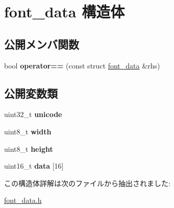 \hypertarget{structfont__data}{}\section{font\+\_\+data 構造体}
\label{structfont__data}
\subsection*{公開メンバ関数}
\begin{DoxyCompactItemize}
\item 
\hypertarget{structfont__data_a739d3ba2d2f02aac83105043a0eba641}{}bool {\bfseries operator==} (const struct \hyperlink{structfont__data}{font\+\_\+data} \&rhs)\label{structfont__data_a739d3ba2d2f02aac83105043a0eba641}

\end{DoxyCompactItemize}
\subsection*{公開変数類}
\begin{DoxyCompactItemize}
\item 
\hypertarget{structfont__data_a4ee6887326fab44ed8adc0e4a33a8b1b}{}uint32\+\_\+t {\bfseries unicode}\label{structfont__data_a4ee6887326fab44ed8adc0e4a33a8b1b}

\item 
\hypertarget{structfont__data_a9f7e5e4e4b681c3361ddceb4e45643f1}{}uint8\+\_\+t {\bfseries width}\label{structfont__data_a9f7e5e4e4b681c3361ddceb4e45643f1}

\item 
\hypertarget{structfont__data_a4f43296d75ddb591b3688ef75ce2bc78}{}uint8\+\_\+t {\bfseries height}\label{structfont__data_a4f43296d75ddb591b3688ef75ce2bc78}

\item 
\hypertarget{structfont__data_a8952da2039b6c55eb723f7bfa96fb90e}{}uint16\+\_\+t {\bfseries data} \mbox{[}16\mbox{]}\label{structfont__data_a8952da2039b6c55eb723f7bfa96fb90e}

\end{DoxyCompactItemize}


この構造体詳解は次のファイルから抽出されました\+:\begin{DoxyCompactItemize}
\item 
\hyperlink{font__data_8h}{font\+\_\+data.\+h}\end{DoxyCompactItemize}
